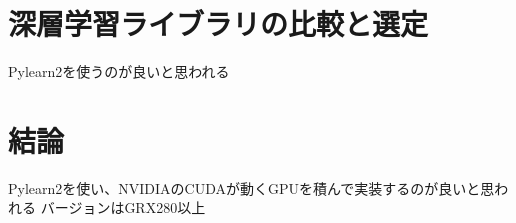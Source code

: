 \section{深層学習ライブラリの比較と選定}
Pylearn2を使うのが良いと思われる

\section{結論}
Pylearn2を使い、NVIDIAのCUDAが動くGPUを積んで実装するのが良いと思われる
バージョンはGRX280以上